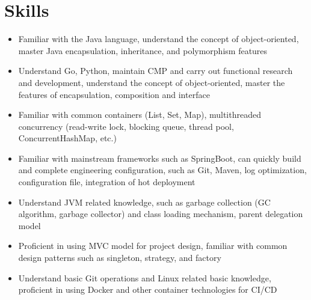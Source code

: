 \documentclass{resume}
\newcommand{\en}[1]{#1}
\newcommand{\zh}[1]{}
\begin{document}
\section{\en{Skills}\zh{技能}}
\begin{itemize}[parsep=0.25ex]
      \item \en{Familiar with the Java language, understand the concept of object-oriented, master Java encapsulation, inheritance, and polymorphism features}
            \zh{熟悉Java语言，理解面向对象思想，掌握 Java 封装、继承和多态特性}

      \item \en{Understand Go, Python, maintain CMP and carry out functional research and development, understand the concept of object-oriented, master the features of encapsulation, composition and interface}
            \zh{了解Go、Python，运维CMP并进行了开发，理解面向对象思想，掌握封装、组合和接口的特性}

      \item \en{Familiar with common containers (List, Set, Map), multithreaded concurrency (read-write lock, blocking queue, thread pool, ConcurrentHashMap, etc.)}
            \zh{熟悉常见容器（List、Set、Map）、多线程并发（读写锁、阻塞队列、线程池、ConcurrentHashMap等）}

      \item \en{Familiar with mainstream frameworks such as SpringBoot, can quickly build and complete engineering configuration, such as Git, Maven, log optimization, configuration file, integration of hot deployment}
            \zh{熟悉SpringBoot等主流框架，可以快速构建并完成工程配置，如Git，Maven，日志优化，配置文件，集成热部署}

      \item \en{Understand JVM related knowledge, such as garbage collection (GC algorithm, garbage collector) and class loading mechanism, parent delegation model}
            \zh{了解JVM相关知识，如垃圾回收（GC算法、垃圾收集器）和类加载机制、双亲委派机模型}

      \item \en{Proficient in using MVC model for project design, familiar with common design patterns such as singleton, strategy, and factory}
            \zh{熟练使用 MVC 模式进行项目设计，熟悉单例，策略，工厂模式等常见的设计模式}

      \item \en{Understand basic Git operations and Linux related basic knowledge, proficient in using Docker and other container technologies for CI/CD}
            \zh{了解Git基本操作以及Linux相关基本知识，熟练使用Docker等容器技术进行CI/CD}


\end{itemize}
\end{document}

